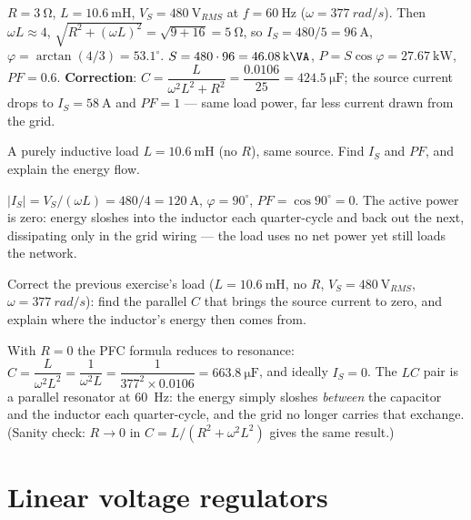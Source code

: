 \documentclass[11pt,a4paper,oneside]{book}
\begin{document}
\begin{wexample}
$R=\qty{3}{\ohm}$, $L=\qty{10.6}{\milli\henry}$, $V_S=\qty{480}{\volt_{RMS}}$ at
$f=\qty{60}{\hertz}$ ($\omega=\qty{377}{rad/s}$). Then $\omega L\approx4$,
$\sqrt{R^2+(\omega L)^2}=\sqrt{9+16}=\qty{5}{\ohm}$, so
$I_S=480/5=\qty{96}{\ampere}$, $\varphi=\arctan(4/3)=53.1^\circ$.
$S=480\cdot96=\qty{46.08}{\kilo\VA}$, $P=S\cos\varphi=\qty{27.67}{\kilo\watt}$,
$PF=0.6$. \textbf{Correction}: $C=\dfrac{L}{\omega^2L^2+R^2}=\dfrac{0.0106}{25}
=\qty{424.5}{\micro\farad}$; the source current drops to $I_S=\qty{58}{\ampere}$
and $PF=1$ --- same load power, far less current drawn from the grid.
\end{wexample}

\begin{exercise}
A purely inductive load $L=\qty{10.6}{\milli\henry}$ (no $R$), same source. Find
$I_S$ and $PF$, and explain the energy flow.
\end{exercise}
\begin{solution}
$|I_S|=V_S/(\omega L)=480/4=\qty{120}{\ampere}$, $\varphi=90^\circ$, $PF=\cos
90^\circ=0$. The active power is zero: energy sloshes into the inductor each
quarter-cycle and back out the next, dissipating only in the grid wiring --- the
load uses no net power yet still loads the network.
\end{solution}

\begin{exercise}
Correct the previous exercise's load ($L=\qty{10.6}{\milli\henry}$, no $R$,
$V_S=\qty{480}{\volt_{RMS}}$, $\omega=\qty{377}{rad/s}$): find the parallel $C$
that brings the source current to zero, and explain where the inductor's energy
then comes from.
\end{exercise}
\begin{solution}
With $R=0$ the PFC formula reduces to resonance:
$C=\dfrac{L}{\omega^2L^2}=\dfrac{1}{\omega^2L}
=\dfrac{1}{377^2\times0.0106}=\qty{663.8}{\micro\farad}$, and ideally
$I_S=0$. The $LC$ pair is a parallel resonator at \qty{60}{\hertz}: the energy
simply sloshes \emph{between} the capacitor and the inductor each quarter-cycle,
and the grid no longer carries that exchange. (Sanity check: $R\to0$ in
$C=L/(R^2+\omega^2L^2)$ gives the same result.)
\end{solution}

\chapter{Linear voltage regulators}\label{ch:linear}
\end{document}
